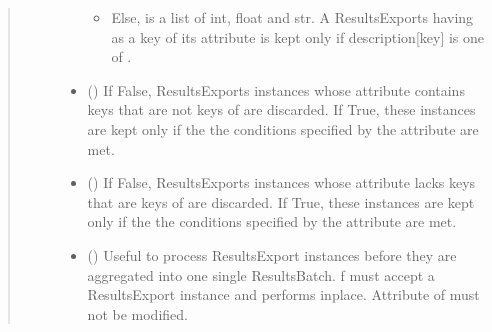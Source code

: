 \documentclass[letterpaper,10pt,english]{sphinxmanual}
\begin{document}
\begin{fulllineitems}
\begin{fulllineitems}
\begin{quote}
\begin{description}
\begin{itemize}
\begin{itemize}
\item {} 
\sphinxAtStartPar
Else,  is a list of int, float and str.
A ResultsExports having  as a key of its  attribute is kept only if description{[}key{]} is one of .

\end{itemize}


\item {} 
\sphinxAtStartPar
{} (\sphinxstyleliteralemphasis{\sphinxupquote{, }}\sphinxstyleliteralemphasis{\sphinxupquote{, }}) \textendash{} If False, ResultsExports instances whose  attribute contains keys that are not keys of  are discarded.
If True, these instances are kept only if the the conditions specified by the  attribute are met.

\item {} 
\sphinxAtStartPar
{} (\sphinxstyleliteralemphasis{\sphinxupquote{, }}\sphinxstyleliteralemphasis{\sphinxupquote{, }}) \textendash{} If False, ResultsExports instances whose  attribute lacks keys that are keys of  are discarded.
If True, these instances are kept only if the the conditions specified by the  attribute are met.

\item {} 
\sphinxAtStartPar
{} (\sphinxstyleliteralemphasis{\sphinxupquote{(}}\sphinxstyleliteralemphasis{\sphinxupquote{)}}\sphinxstyleliteralemphasis{\sphinxupquote{, }}) \textendash{} Useful to process ResultsExport instances before they are aggregated into one single ResultsBatch.
f must accept a ResultsExport instance and performs inplace.
Attribute  of  must not be modified.


\end{itemize}
\end{description}
\end{quote}
\end{fulllineitems}
\end{fulllineitems}
\end{document}

